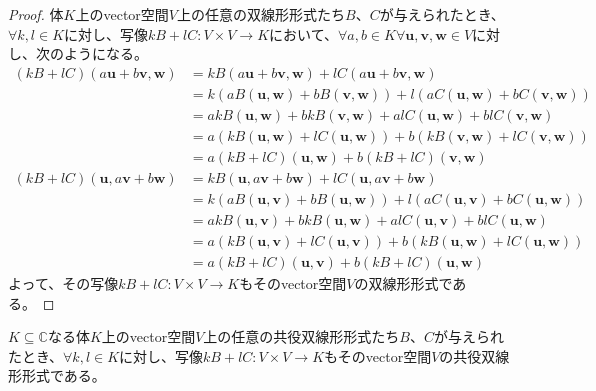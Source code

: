 \documentclass[dvipdfmx]{jsarticle}
\begin{document}
\begin{proof}
体$K$上のvector空間$V$上の任意の双線形形式たち$B$、$C$が与えられたとき、$\forall k,l \in K$に対し、写像$kB + lC:V \times V \rightarrow K$において、$\forall a,b \in K\forall\mathbf{u},\mathbf{v},\mathbf{w} \in V$に対し、次のようになる。
\begin{align*}
(kB + lC)\left( a\mathbf{u} + b\mathbf{v},\mathbf{w} \right) &= kB\left( a\mathbf{u} + b\mathbf{v},\mathbf{w} \right) + lC\left( a\mathbf{u} + b\mathbf{v},\mathbf{w} \right)\\
&= k\left( aB\left( \mathbf{u},\mathbf{w} \right) + bB\left( \mathbf{v},\mathbf{w} \right) \right) + l\left( aC\left( \mathbf{u},\mathbf{w} \right) + bC\left( \mathbf{v},\mathbf{w} \right) \right)\\
&= akB\left( \mathbf{u},\mathbf{w} \right) + bkB\left( \mathbf{v},\mathbf{w} \right) + alC\left( \mathbf{u},\mathbf{w} \right) + blC\left( \mathbf{v},\mathbf{w} \right)\\
&= a\left( kB\left( \mathbf{u},\mathbf{w} \right) + lC\left( \mathbf{u},\mathbf{w} \right) \right) + b\left( kB\left( \mathbf{v},\mathbf{w} \right) + lC\left( \mathbf{v},\mathbf{w} \right) \right)\\
&= a(kB + lC)\left( \mathbf{u},\mathbf{w} \right) + b(kB + lC)\left( \mathbf{v},\mathbf{w} \right)\\
(kB + lC)\left( \mathbf{u},a\mathbf{v} + b\mathbf{w} \right) &= kB\left( \mathbf{u},a\mathbf{v} + b\mathbf{w} \right) + lC\left( \mathbf{u},a\mathbf{v} + b\mathbf{w} \right)\\
&= k\left( aB\left( \mathbf{u},\mathbf{v} \right) + bB\left( \mathbf{u},\mathbf{w} \right) \right) + l\left( aC\left( \mathbf{u},\mathbf{v} \right) + bC\left( \mathbf{u},\mathbf{w} \right) \right)\\
&= akB\left( \mathbf{u},\mathbf{v} \right) + bkB\left( \mathbf{u},\mathbf{w} \right) + alC\left( \mathbf{u},\mathbf{v} \right) + blC\left( \mathbf{u},\mathbf{w} \right)\\
&= a\left( kB\left( \mathbf{u},\mathbf{v} \right) + lC\left( \mathbf{u},\mathbf{v} \right) \right) + b\left( kB\left( \mathbf{u},\mathbf{w} \right) + lC\left( \mathbf{u},\mathbf{w} \right) \right)\\
&= a(kB + lC)\left( \mathbf{u},\mathbf{v} \right) + b(kB + lC)\left( \mathbf{u},\mathbf{w} \right)
\end{align*}
よって、その写像$kB + lC:V \times V \rightarrow K$もそのvector空間$V$の双線形形式である。
\end{proof}
\begin{thm}\label{2.3.4.5}
$K \subseteq \mathbb{C}$なる体$K$上のvector空間$V$上の任意の共役双線形形式たち$B$、$C$が与えられたとき、$\forall k,l \in K$に対し、写像$kB + lC:V \times V \rightarrow K$もそのvector空間$V$の共役双線形形式である。
\end{thm}
\end{document}
